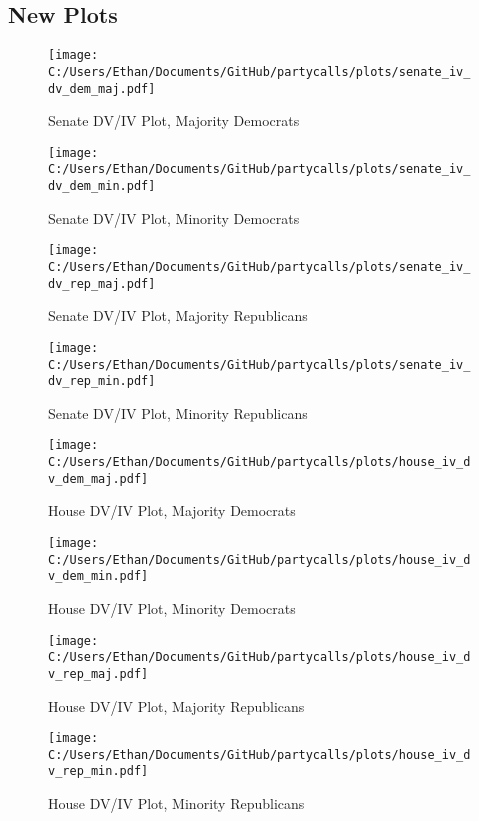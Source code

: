 \documentclass[12pt]{article}
\begin{document}
\clearpage

\subsection{New Plots}

\begin{figure}[H]
	\centering
	\caption{Senate DV/IV Plot, Majority Democrats}
	\texttt{[image: C:/Users/Ethan/Documents/GitHub/partycalls/plots/senate\_iv\_dv\_dem\_maj.pdf]}
\end{figure}

\begin{figure}[H]
	\centering
	\caption{Senate DV/IV Plot, Minority Democrats}
	\texttt{[image: C:/Users/Ethan/Documents/GitHub/partycalls/plots/senate\_iv\_dv\_dem\_min.pdf]}
\end{figure}

\begin{figure}[H]
	\centering
	\caption{Senate DV/IV Plot, Majority Republicans}
	\texttt{[image: C:/Users/Ethan/Documents/GitHub/partycalls/plots/senate\_iv\_dv\_rep\_maj.pdf]}
\end{figure}

\begin{figure}[H]
	\centering
	\caption{Senate DV/IV Plot, Minority Republicans}
	\texttt{[image: C:/Users/Ethan/Documents/GitHub/partycalls/plots/senate\_iv\_dv\_rep\_min.pdf]}
\end{figure}

\begin{figure}[H]
	\centering
	\caption{House DV/IV Plot, Majority Democrats}
	\texttt{[image: C:/Users/Ethan/Documents/GitHub/partycalls/plots/house\_iv\_dv\_dem\_maj.pdf]}
\end{figure}

\begin{figure}[H]
	\centering
	\caption{House DV/IV Plot, Minority Democrats}
	\texttt{[image: C:/Users/Ethan/Documents/GitHub/partycalls/plots/house\_iv\_dv\_dem\_min.pdf]}
\end{figure}

\begin{figure}[H]
	\centering
	\caption{House DV/IV Plot, Majority Republicans}
	\texttt{[image: C:/Users/Ethan/Documents/GitHub/partycalls/plots/house\_iv\_dv\_rep\_maj.pdf]}
\end{figure}

\begin{figure}[H]
	\centering
	\caption{House DV/IV Plot, Minority Republicans}
	\texttt{[image: C:/Users/Ethan/Documents/GitHub/partycalls/plots/house\_iv\_dv\_rep\_min.pdf]}
\end{figure}
\end{document}
